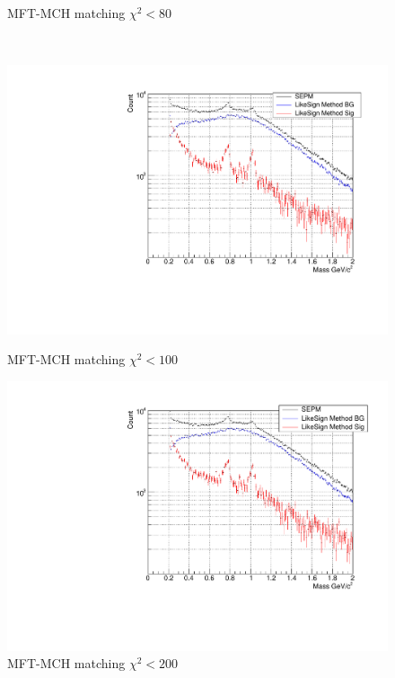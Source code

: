 \begin{figure}[htbp]
\begin{minipage}{0.45\textwidth}
                    \captionsetup{labelformat=empty}
                    \caption{MFT-MCH matching $\chi^2 < 80$} 
                    \label{fig:chi2_80}
                \end{minipage}
                \\
                \vspace{1em}
                \begin{minipage}{0.45\textwidth}
                    \centering
                    \includegraphics[width=\textwidth]{fig/3_4_4_chi2_100.pdf}
                    \captionsetup{labelformat=empty}
                    \caption{MFT-MCH matching $\chi^2 < 100$}
                    \label{fig:chi2_100}
                \end{minipage}
                \hfill
                \begin{minipage}{0.45\textwidth}
                    \centering
                    \includegraphics[width=\textwidth]{fig/3_4_4_chi2_200.pdf}
                    \captionsetup{labelformat=empty}
                    \caption{MFT-MCH matching $\chi^2 < 200$}
                    \label{fig:chi2_200}
                \end{minipage}
            \end{figure}
